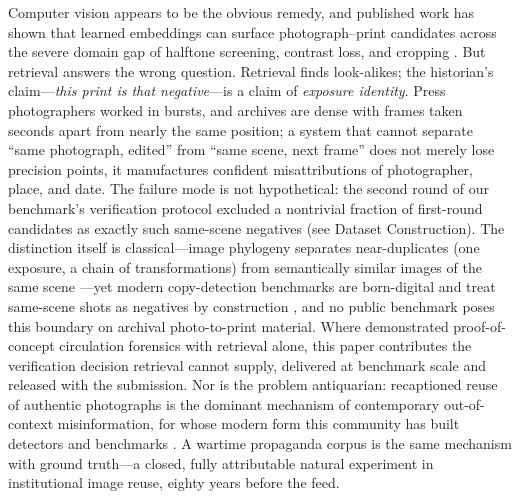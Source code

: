 \documentclass[letterpaper]{article} %
\begin{document}
Computer vision appears to be the obvious remedy, and published work has shown
that learned embeddings can surface photograph--print candidates across the
severe domain gap of halftone screening, contrast loss, and cropping
\cite{du2024probing}. But retrieval answers the wrong question. Retrieval
finds look-alikes; the historian's claim---\emph{this print is that
negative}---is a claim of \emph{exposure identity}. Press photographers worked
in bursts, and archives are dense with frames taken seconds apart from nearly
the same position; a system that cannot separate ``same photograph, edited''
from ``same scene, next frame'' does not merely lose precision points, it
manufactures confident misattributions of photographer, place, and date. The
failure mode is not hypothetical: the second round of our benchmark's
verification protocol excluded a nontrivial fraction of first-round
candidates as exactly such same-scene negatives (see Dataset Construction).
The distinction itself is classical---image phylogeny separates near-duplicates
(one exposure, a chain of transformations) from semantically similar images of
the same scene \cite{dias2013forests,chum2007scalable}---yet modern
copy-detection benchmarks are born-digital and treat same-scene shots as
negatives by construction \cite{douze2021disc,pizzi2022sscd,wang2023ndec}, and
no public benchmark poses this boundary on archival photo-to-print material.
Where \citet{du2024probing} demonstrated proof-of-concept circulation
forensics with retrieval alone, this paper contributes the verification
decision retrieval cannot supply, delivered at benchmark scale and released
with the submission. Nor is
the problem antiquarian: recaptioned reuse of authentic photographs is the
dominant mechanism of contemporary out-of-context misinformation, for whose
modern form this community has built detectors and benchmarks
\cite{aneja2023cosmos,qi2024sniffer}. A wartime propaganda corpus is the same
mechanism with ground truth---a closed, fully attributable natural experiment
in institutional image reuse, eighty years before the feed.
\end{document}
